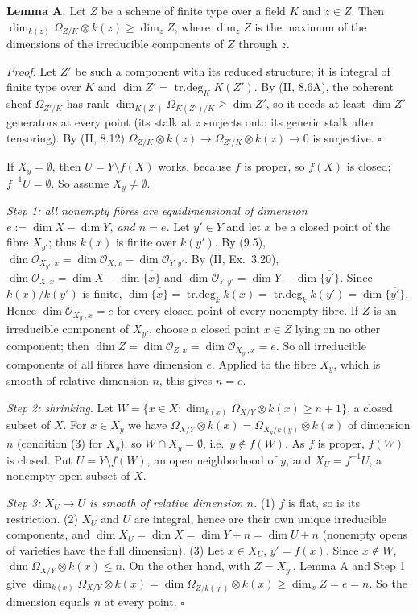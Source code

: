 \documentclass[11pt]{article}
\begin{document}
\textbf{Lemma A.} Let $Z$ be a scheme of finite type over a field $K$ and $z\in Z$. Then $\dim_{k(z)}\Omega_{Z/K}\otimes k(z)\ge \dim_zZ$, where $\dim_zZ$ is the maximum of the dimensions of the irreducible components of $Z$ through $z$.

\emph{Proof.} Let $Z'$ be such a component with its reduced structure; it is integral of finite type over $K$ and $\dim Z'=\operatorname{tr.deg}_KK(Z')$. By (II, 8.6A), the coherent sheaf $\Omega_{Z'/K}$ has rank $\dim_{K(Z')}\Omega_{K(Z')/K}\ge\dim Z'$, so it needs at least $\dim Z'$ generators at every point (its stalk at $z$ surjects onto its generic stalk after tensoring). By (II, 8.12) $\Omega_{Z/K}\otimes k(z)\to\Omega_{Z'/K}\otimes k(z)\to0$ is surjective. $\square$

If $X_y=\emptyset$, then $U=Y\setminus f(X)$ works, because $f$ is proper, so $f(X)$ is closed; $f^{-1}U=\emptyset$. So assume $X_y\ne\emptyset$.

\emph{Step 1: all nonempty fibres are equidimensional of dimension $e:=\dim X-\dim Y$, and $n=e$.} Let $y'\in Y$ and let $x$ be a closed point of the fibre $X_{y'}$; thus $k(x)$ is finite over $k(y')$. By (9.5), $\dim\mathcal O_{X_{y'},x}=\dim\mathcal O_{X,x}-\dim\mathcal O_{Y,y'}$. By (II, Ex.~3.20), $\dim\mathcal O_{X,x}=\dim X-\dim\overline{\{x\}}$ and $\dim\mathcal O_{Y,y'}=\dim Y-\dim\overline{\{y'\}}$. Since $k(x)/k(y')$ is finite, $\dim\overline{\{x\}}=\operatorname{tr.deg}_kk(x)=\operatorname{tr.deg}_kk(y')=\dim\overline{\{y'\}}$. Hence $\dim\mathcal O_{X_{y'},x}=e$ for every closed point of every nonempty fibre. If $Z$ is an irreducible component of $X_{y'}$, choose a closed point $x\in Z$ lying on no other component; then $\dim Z=\dim\mathcal O_{Z,x}=\dim\mathcal O_{X_{y'},x}=e$. So all irreducible components of all fibres have dimension $e$. Applied to the fibre $X_y$, which is smooth of relative dimension $n$, this gives $n=e$.

\emph{Step 2: shrinking.} Let $W=\{x\in X:\dim_{k(x)}\Omega_{X/Y}\otimes k(x)\ge n+1\}$, a closed subset of $X$. For $x\in X_y$ we have $\Omega_{X/Y}\otimes k(x)=\Omega_{X_y/k(y)}\otimes k(x)$ of dimension $n$ (condition (3) for $X_y$), so $W\cap X_y=\emptyset$, i.e.\ $y\notin f(W)$. As $f$ is proper, $f(W)$ is closed. Put $U=Y\setminus f(W)$, an open neighborhood of $y$, and $X_U=f^{-1}U$, a nonempty open subset of $X$.

\emph{Step 3: $X_U\to U$ is smooth of relative dimension $n$.} (1) $f$ is flat, so is its restriction. (2) $X_U$ and $U$ are integral, hence are their own unique irreducible components, and $\dim X_U=\dim X=\dim Y+n=\dim U+n$ (nonempty opens of varieties have the full dimension). (3) Let $x\in X_U$, $y'=f(x)$. Since $x\notin W$, $\dim\Omega_{X/Y}\otimes k(x)\le n$. On the other hand, with $Z=X_{y'}$, Lemma A and Step 1 give $\dim_{k(x)}\Omega_{X/Y}\otimes k(x)=\dim\Omega_{Z/k(y')}\otimes k(x)\ge\dim_xZ=e=n$. So the dimension equals $n$ at every point. \hfill$\square$
\end{document}
